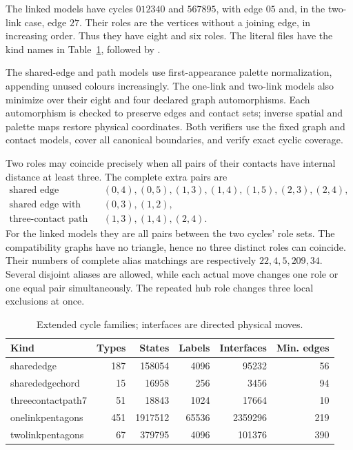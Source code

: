 The linked models have cycles $012340$ and $567895$, with edge $05$
and, in the two-link case, edge $27$. Their roles are the vertices
without a joining edge, in increasing order. Thus they have eight
and six roles. The literal files have the kind names in
Table~\ref{tab:extended-cycle-counts}, followed by .

The shared-edge and path models use first-appearance palette
normalization, appending unused colours increasingly. The one-link
and two-link models also minimize over their eight and four declared
graph automorphisms. Each automorphism is checked to preserve edges
and contact sets; inverse spatial and palette maps restore physical
coordinates. Both verifiers use the fixed graph and contact models, cover all
canonical boundaries, and verify exact cyclic coverage.

Two roles may coincide precisely when all pairs of their contacts
have internal distance at least three. The complete extra pairs are
\[
\begin{array}{cl}
\text{shared edge}&(0,4),(0,5),(1,3),(1,4),(1,5),(2,3),(2,4),\\
\text{shared edge with chord}&(0,3),(1,2),\\
\text{three-contact path}&(1,3),(1,4),(2,4).
\end{array}
\]
For the linked models they are all pairs between the two cycles'
role sets. The compatibility graphs have no triangle, hence no
three distinct roles can coincide. Their numbers of complete alias
matchings are respectively $22,4,5,209,34$. Several disjoint aliases
are allowed, while each actual move changes one role or one equal
pair simultaneously. The repeated hub role changes three local
exclusions at once.

\begin{table}[htbp]
\centering\small
\caption{Extended cycle families; interfaces are directed physical moves.}
\label{tab:extended-cycle-counts}
\begin{tabular}{lrrrrr}
\toprule
Kind & Types & States & Labels & Interfaces & Min. edges\\
\midrule
sharededge&187&158054&4096&95232&56\\
sharededgechord&15&16958&256&3456&94\\
threecontactpath7&51&18843&1024&17664&10\\
onelinkpentagons&451&1917512&65536&2359296&219\\
twolinkpentagons&67&379795&4096&101376&390\\
\bottomrule
\end{tabular}
\end{table}

